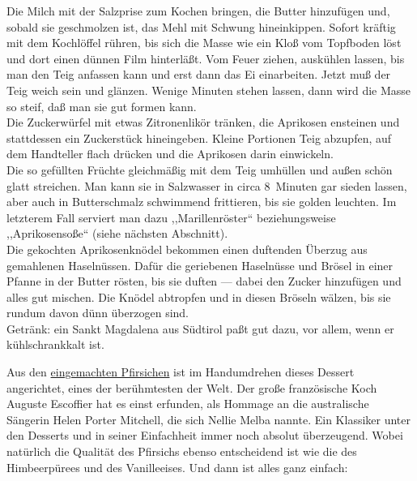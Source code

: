       \begin{zubereitung}
        Die Milch mit der Salzprise zum Kochen bringen, die Butter hinzufügen
	und, sobald sie geschmolzen ist, das Mehl mit Schwung hineinkippen.
	Sofort kräftig mit dem Kochlöffel rühren, bis sich die Masse wie ein
	Kloß vom Topfboden löst und dort einen dünnen Film hinterläßt. Vom
	Feuer ziehen, auskühlen lassen, bis man den Teig anfassen kann und erst
	dann das Ei einarbeiten. Jetzt muß der Teig weich sein und glänzen.
	Wenige Minuten stehen lassen, dann wird die Masse so steif, daß man sie
	gut formen kann. \\
	Die Zuckerwürfel mit etwas Zitronenlikör tränken, die Aprikosen
	ensteinen und stattdessen ein Zuckerstück hineingeben. Kleine Portionen
	Teig abzupfen, auf dem Handteller flach drücken und die Aprikosen
	darin einwickeln. \\
	Die so gefüllten Früchte gleichmäßig mit dem Teig umhüllen und außen
	schön glatt streichen. Man kann sie in Salzwasser in circa 8~Minuten
	gar sieden lassen, aber auch in Butterschmalz schwimmend frittieren,
	bis sie golden leuchten. Im letzterem Fall serviert man dazu
	,,Marillenröster`` beziehungsweise ,,Aprikosensoße`` (siehe nächsten
	Abschnitt). \\
	Die gekochten Aprikosenknödel bekommen einen duftenden Überzug aus
	gemahlenen Haselnüssen. Dafür die geriebenen Haselnüsse und Brösel in
	einer Pfanne in der Butter rösten, bis sie duften --- dabei den Zucker
	hinzufügen und alles gut mischen. Die Knödel abtropfen und in diesen
	Bröseln wälzen, bis sie rundum davon dünn überzogen sind. \\
	Getränk: ein Sankt Magdalena aus Südtirol paßt gut dazu, vor allem,
	wenn er kühlschrankkalt ist. \\
      \end{zubereitung}


      \begin{einleitung}
        Aus den \underline{eingemachten Pfirsichen} ist im Handumdrehen dieses
        Dessert angerichtet, eines der berühmtesten der Welt. Der große
        französische Koch Auguste Escoffier hat es einst erfunden, als Hommage
        an die australische Sängerin Helen Porter Mitchell, die sich Nellie
	Melba nannte. Ein Klassiker unter den Desserts und in seiner
	Einfachheit immer noch absolut überzeugend. Wobei natürlich die
	Qualität des Pfirsichs ebenso entscheidend ist wie die des
	Himbeerpürees und des Vanilleeises. Und dann ist alles ganz einfach: \\
      \end{einleitung}

